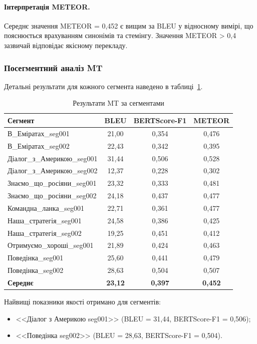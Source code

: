 \paragraph{Інтерпретація METEOR.}
Середнє значення METEOR = 0,452 є вищим за BLEU у відносному вимірі,
що пояснюється врахуванням синонімів та стемінгу. Значення METEOR > 0,4
зазвичай відповідає якісному перекладу.

\subsubsection{Посегментний аналіз MT}

Детальні результати для кожного сегмента наведено в таблиці~\ref{tab:mt_detailed}.

\begin{table}[H]
\centering
\caption{Результати MT за сегментами}
\label{tab:mt_detailed}
\small
\begin{tabular}{|l|c|c|c|}
\hline
\textbf{Сегмент} & \textbf{BLEU} & \textbf{BERTScore-F1} & \textbf{METEOR} \\
\hline
В\_Еміратах\_seg001 & 21,00 & 0,354 & 0,476 \\
В\_Еміратах\_seg002 & 22,43 & 0,342 & 0,395 \\
Діалог\_з\_Америкою\_seg001 & 31,44 & 0,506 & 0,528 \\
Діалог\_з\_Америкою\_seg002 & 12,37 & 0,228 & 0,302 \\
Знаємо\_що\_росіяни\_seg001 & 23,32 & 0,333 & 0,481 \\
Знаємо\_що\_росіяни\_seg002 & 24,18 & 0,437 & 0,477 \\
Командна\_ланка\_seg001 & 22,71 & 0,361 & 0,477 \\
Наша\_стратегія\_seg001 & 24,58 & 0,386 & 0,425 \\
Наша\_стратегія\_seg002 & 19,25 & 0,451 & 0,412 \\
Отримуємо\_хороші\_seg001 & 21,89 & 0,424 & 0,463 \\
Поведінка\_seg001 & 25,60 & 0,441 & 0,479 \\
Поведінка\_seg002 & 28,63 & 0,504 & 0,507 \\
\hline
\textbf{Середнє} & \textbf{23,12} & \textbf{0,397} & \textbf{0,452} \\
\hline
\end{tabular}
\end{table}

Найвищі показники якості отримано для сегментів:
\begin{itemize}
    \item <<Діалог з Америкою seg001>> (BLEU = 31,44, BERTScore-F1 = 0,506);
    \item <<Поведінка seg002>> (BLEU = 28,63, BERTScore-F1 = 0,504).
\end{itemize}

